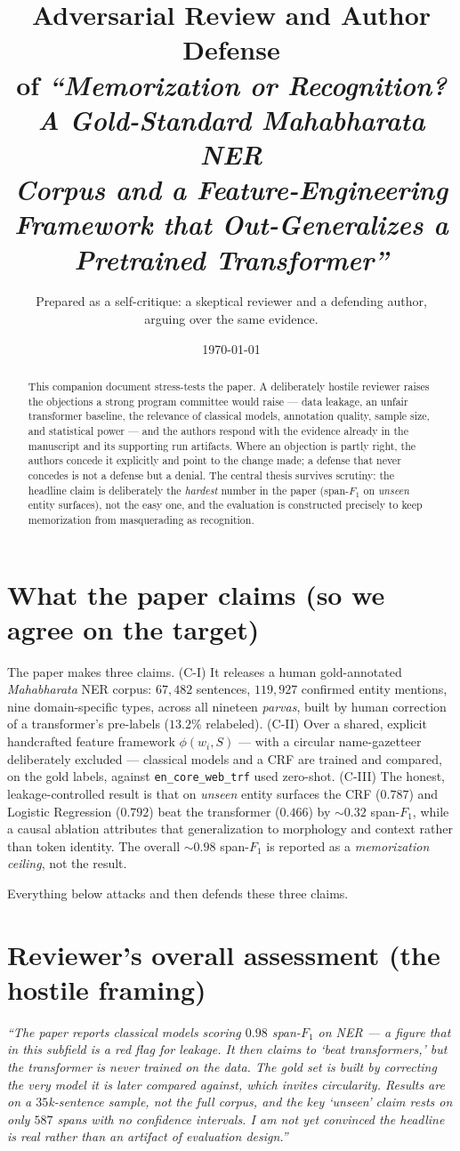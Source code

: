 \documentclass[11pt]{article}
\title{\textbf{Adversarial Review and Author Defense}\\[4pt]
\large of \emph{``Memorization or Recognition? A Gold-Standard Mahabharata NER\\
Corpus and a Feature-Engineering Framework that Out-Generalizes a\\
Pretrained Transformer''}}
\author{Prepared as a self-critique: a skeptical reviewer and a defending author,\\
arguing over the same evidence.}
\date{\today}
\begin{document}
\maketitle

\begin{abstract}
\noindent This companion document stress-tests the paper. A deliberately hostile
reviewer raises the objections a strong program committee would raise --- data
leakage, an unfair transformer baseline, the relevance of classical models,
annotation quality, sample size, and statistical power --- and the authors
respond with the evidence already in the manuscript and its supporting run
artifacts. Where an objection is partly right, the authors concede it explicitly
and point to the change made; a defense that never concedes is not a defense but
a denial. The central thesis survives scrutiny: the headline claim is deliberately
the \emph{hardest} number in the paper (span-$F_1$ on \emph{unseen} entity
surfaces), not the easy one, and the evaluation is constructed precisely to keep
memorization from masquerading as recognition.
\end{abstract}

\section{What the paper claims (so we agree on the target)}
The paper makes three claims. (C-I) It releases a human gold-annotated
\emph{Mahabharata} NER corpus: $67{,}482$ sentences, $119{,}927$ confirmed entity
mentions, nine domain-specific types, across all nineteen \emph{parvas}, built by
human correction of a transformer's pre-labels ($13.2\%$ relabeled). (C-II) Over a
shared, explicit handcrafted feature framework $\phi(w_i,S)$ --- with a circular
name-gazetteer deliberately excluded --- classical models and a CRF are trained
and compared, on the gold labels, against \texttt{en\_core\_web\_trf} used
zero-shot. (C-III) The honest, leakage-controlled result is that on \emph{unseen}
entity surfaces the CRF ($0.787$) and Logistic Regression ($0.792$) beat the
transformer ($0.466$) by $\sim\!0.32$ span-$F_1$, while a causal ablation
attributes that generalization to morphology and context rather than token
identity. The overall $\sim\!0.98$ span-$F_1$ is reported as a
\emph{memorization ceiling}, not the result.

Everything below attacks and then defends these three claims.

\section{Reviewer's overall assessment (the hostile framing)}
\textcolor{revcol}{\itshape
``The paper reports classical models scoring $0.98$ span-$F_1$ on NER --- a figure
that in this subfield is a red flag for leakage. It then claims to `beat
transformers,' but the transformer is never trained on the data. The gold set is
built by correcting the very model it is later compared against, which invites
circularity. Results are on a $35$k-sentence sample, not the full corpus, and the
key `unseen' claim rests on only $587$ spans with no confidence intervals. I am not
yet convinced the headline is real rather than an artifact of evaluation design.''}
\end{document}
